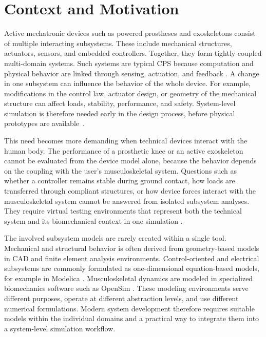 \section{Context and Motivation}
\label{sec:motivation}

Active mechatronic devices such as powered prostheses and exoskeletons consist of multiple interacting subsystems.
These include mechanical structures, actuators, sensors, and embedded controllers.
Together, they form tightly coupled multi-domain systems.
Such systems are typical \ac{CPS} because computation and physical behavior are linked through sensing, actuation, and feedback \cite{lee_cyber_2008}.
A change in one subsystem can influence the behavior of the whole device.
For example, modifications in the control law, actuator design, or geometry of the mechanical structure can affect loads, stability, performance, and safety.
System-level simulation is therefore needed early in the design process, before physical prototypes are available~\cite{van_der_auweraer_virtual_2013}.

This need becomes more demanding when technical devices interact with the human body.
The performance of a prosthetic knee or an active exoskeleton cannot be evaluated from the device model alone, because the behavior depends on the coupling with the user's musculoskeletal system.
Questions such as whether a controller remains stable during ground contact, how loads are transferred through compliant structures, or how device forces interact with the musculoskeletal system cannot be answered from isolated subsystem analyses.
They require virtual testing environments that represent both the technical system and its biomechanical context in one simulation \cite{eberle_biomechanical_2025}.

The involved subsystem models are rarely created within a single tool.
Mechanical and structural behavior is often derived from geometry-based models in \ac{CAD} and finite element analysis environments.
Control-oriented and electrical subsystems are commonly formulated as one-dimensional equation-based models, for example in Modelica \cite{Modelica_Fritzson}.
Musculoskeletal dynamics are modeled in specialized biomechanics software such as OpenSim \cite{OpenSim_Delp}.
These modeling environments serve different purposes, operate at different abstraction levels, and use different numerical formulations.
Modern system development therefore requires suitable models within the individual domains and a practical way to integrate them into a system-level simulation workflow.

